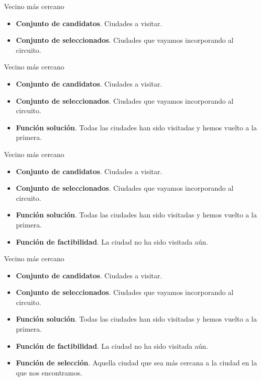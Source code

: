 \documentclass{beamer}
\begin{document}
\begin{frame}[fragile]{Vecino más cercano}

\begin{itemize}
	\item \textbf{Conjunto de candidatos}. Ciudades a visitar.
	\item \textbf{Conjunto de seleccionados}. Ciudades que vayamos incorporando al circuito.
\end{itemize}

\end{frame}

\begin{frame}[fragile]{Vecino más cercano}

\begin{itemize}
	\item \textbf{Conjunto de candidatos}. Ciudades a visitar.
	\item \textbf{Conjunto de seleccionados}. Ciudades que vayamos incorporando al circuito.
	\item \textbf{Función solución}. Todas las ciudades han sido visitadas y hemos vuelto a la primera.
\end{itemize}

\end{frame}

\begin{frame}[fragile]{Vecino más cercano}

\begin{itemize}
	\item \textbf{Conjunto de candidatos}. Ciudades a visitar.
	\item \textbf{Conjunto de seleccionados}. Ciudades que vayamos incorporando al circuito.
	\item \textbf{Función solución}. Todas las ciudades han sido visitadas y hemos vuelto a la primera.
	\item \textbf{Función de factibilidad}. La ciudad no ha sido visitada aún.
\end{itemize}

\end{frame}

\begin{frame}[fragile]{Vecino más cercano}

\begin{itemize}
	\item \textbf{Conjunto de candidatos}. Ciudades a visitar.
	\item \textbf{Conjunto de seleccionados}. Ciudades que vayamos incorporando al circuito.
	\item \textbf{Función solución}. Todas las ciudades han sido visitadas y hemos vuelto a la primera.
	\item \textbf{Función de factibilidad}. La ciudad no ha sido visitada aún.
	\item \textbf{Función de selección}. Aquella ciudad que sea más cercana a la ciudad en la que nos encontramos.
\end{itemize}

\end{frame}
\end{document}

